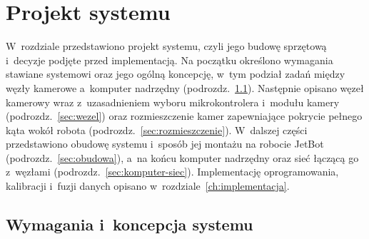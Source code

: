 \chapter{Projekt systemu}
\label{ch:projekt}
W~rozdziale przedstawiono projekt systemu, czyli jego budowę sprzętową
i~decyzje podjęte przed implementacją. Na początku określono wymagania
stawiane systemowi oraz jego ogólną koncepcję, w~tym podział zadań między
węzły kamerowe a~komputer nadrzędny (podrozdz.~\ref{sec:wymagania}).
Następnie opisano węzeł kamerowy wraz z~uzasadnieniem wyboru mikrokontrolera
i~modułu kamery (podrozdz.~\ref{sec:wezel}) oraz rozmieszczenie kamer
zapewniające pokrycie pełnego kąta wokół robota (podrozdz.~\ref{sec:rozmieszczenie}).
W~dalszej części przedstawiono obudowę systemu i~sposób jej montażu na
robocie JetBot (podrozdz.~\ref{sec:obudowa}), a~na końcu komputer nadrzędny
oraz sieć łączącą go z~węzłami (podrozdz.~\ref{sec:komputer-siec}).
Implementację oprogramowania, kalibracji i~fuzji danych opisano
w~rozdziale~\ref{ch:implementacja}.
\section{Wymagania i~koncepcja systemu}
\label{sec:wymagania}

